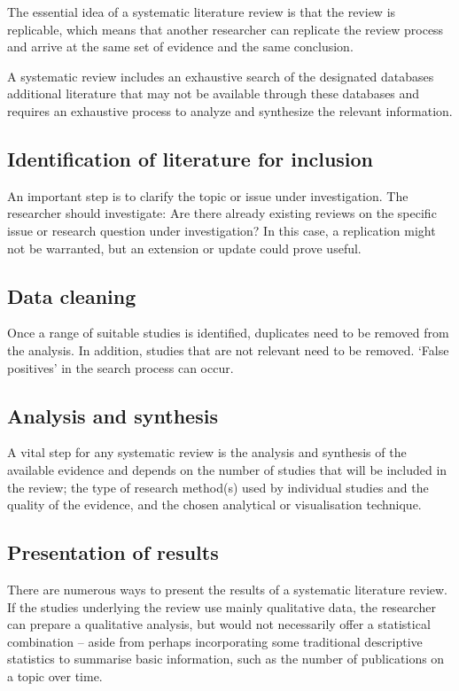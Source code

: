 \documentclass[letterpaper,10pt]{article}
\begin{document}
The essential idea of a systematic literature review is that the review is replicable, which means that another researcher can replicate the review process and arrive at the same set of evidence and the same conclusion.

A systematic review includes an exhaustive search of the designated databases additional literature that may not be available through these databases and requires an exhaustive process to analyze and synthesize the relevant information.


\subsection{Identification of literature for inclusion}
An important step is to clarify the topic or issue under investigation. The researcher should investigate: Are there already existing reviews on the specific issue or research question under investigation? In this case, a replication might not be warranted, but an extension or update could prove useful.
\subsection{Data cleaning}
Once a range of suitable studies is identified, duplicates need to be removed from the analysis. In
addition, studies that are not relevant need to be removed. ‘False positives’ in the search process
can occur.


\subsection{Analysis and synthesis}

A vital step for any systematic review is the analysis and synthesis of the available evidence and depends on the number of studies that will be included in the review; the type of research method(s) used by individual studies and the quality of the evidence, and the chosen analytical or visualisation technique.


\subsection{Presentation of results}
There are numerous ways to present the results of a systematic literature review. If the studies
underlying the review use mainly qualitative data, the researcher can prepare a qualitative analysis,
but would not necessarily offer a statistical combination – aside from perhaps incorporating some
traditional descriptive statistics to summarise basic information, such as the
number of publications on a topic over time.\\
\end{document}
